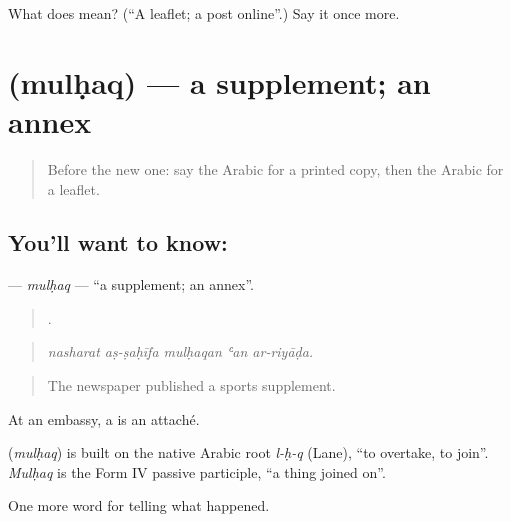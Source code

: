 \begin{tcolorbox}[breakable,colback=teal!4,colframe=teal!35!black,title={Before you move on}]
What does  mean? (\textquotedblleft{}A leaflet; a post online\textquotedblright{}.) Say it once more.
\end{tcolorbox}
\section[\texorpdfstring{\ar{ملحق} (mulḥaq)}{ملحق (mulḥaq)}]{ (mulḥaq) — a supplement; an annex}

\label{lesson:AR-C350-mulhaq}



\begin{quote}
Before the new one: say the Arabic for a printed copy, then the Arabic for a leaflet.
\end{quote}

\subsection*{You'll want to know: }
\textbf{} — \emph{mulḥaq} — \textquotedblleft{}a supplement; an annex\textquotedblright{}.

\begin{quote}
    .
\end{quote}

\begin{quote}
\emph{nasharat aṣ-ṣaḥīfa mulḥaqan ʿan ar-riyāḍa.}
\end{quote}

\begin{quote}
The newspaper published a sports supplement.
\end{quote}

At an embassy, a  is an attaché.

\begin{cousinweb}
\textbf{} (\emph{mulḥaq}) is built on the native Arabic root \emph{l-ḥ-q} (Lane), \textquotedblleft{}to overtake, to join\textquotedblright{}. \emph{Mulḥaq} is the Form IV passive participle, \textquotedblleft{}a thing joined on\textquotedblright{}.
\end{cousinweb}

\begin{grammarlens}[title={What you've built}]
One more word for telling what happened.
\end{grammarlens}

